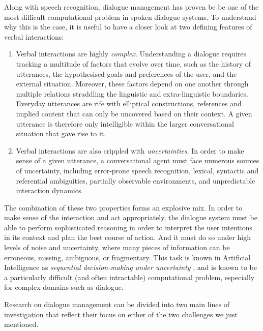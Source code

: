 Along with speech recognition, dialogue management has proven be be one of the most difficult computational problem in spoken dialogue systems. To understand why this is the case, it is useful to have a closer look at two defining features of verbal interactions:
\begin{enumerate}
\item Verbal interactions are highly \textit{complex}.   Understanding a dialogue requires tracking a multitude of factors that evolve over time, such as the history of utterances, the hypothesised goals and preferences of the user, and the external situation. Moreover, these factors depend on one another through multiple relations straddling the linguistic and extra-linguistic boundaries. Everyday utterances are rife with elliptical constructions, references and implied content that can only be uncovered based on their context. A given utterance is therefore only intelligible within the larger conversational situation that gave rise to it. 

\item Verbal interactions are also crippled with \textit{uncertainties}.  In order to make sense of a given utterance, a conversational agent must face numerous sources of uncertainty, including error-prone speech recognition, lexical,  syntactic and referential ambiguities, partially observable environments, and unpredictable interaction dynamics.  
\end{enumerate} 

The combination of these two properties forms an explosive mix.  In order to make sense of the interaction and act appropriately, the dialogue system must be able to perform sophisticated reasoning in order to interpret the user intentions in its context and plan the best course of action.  And it must do so under high levels of noise and uncertainty, where many pieces of information can be erroneous, missing, ambiguous, or fragmentary. This task is known in Artificial Intelligence as \textit{sequential decision-making under uncertainty} \citep{Kaelbling:1998,aima2010}, and is known to be a particularly difficult (and often intractable) computational problem, especially for complex domains such as dialogue. 

Research on dialogue management can be divided into two main lines of investigation that reflect their focus on either of the two challenges we just mentioned.  

